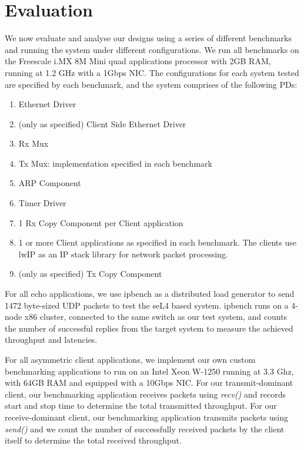\chapter{Evaluation}\label{ch:evaluation}

We now evaluate and analyse our designs using a series of different benchmarks and running
the system under different configurations. We run all benchmarks on the
Freescale i.MX 8M Mini quad applications processor with 2GB RAM, running at 1.2 GHz
with a 1Gbps NIC. The configurations for each system tested are specified by each benchmark,
and the system comprises of the following PDs:
\begin{enumerate}
    \item Ethernet Driver
    \item (only as specified) Client Side Ethernet Driver
    \item Rx Mux
    \item Tx Mux: implementation specified in each benchmark
    \item ARP Component
    \item Timer Driver
    \item 1 Rx Copy Component per Client application
    \item 1 or more Client applications as specified in each benchmark. 
        The clients use lwIP \cite{Dunkels_01} as an IP stack library for network packet processing. 
    \item (only as specified) Tx Copy Component
\end{enumerate}

For all echo applications, we use ipbench as a distributed load generator 
to send 1472 byte-sized UDP packets to test the seL4 based system. ipbench runs on a 4-node x86 cluster, 
connected to the same switch as our test system,
and counts the number of successful replies from the target system to measure the achieved throughput and latencies.

For all asymmetric client applications, we implement our own custom benchmarking applications to run on an Intel Xeon W-1250
running at 3.3 Ghz, with 64GB RAM and equipped with a 10Gbps NIC. For our transmit-dominant client, our benchmarking
application receives packets using \emph{recv()} and records start and stop time to determine the total transmitted
throughput. For our receive-dominant client, our benchmarking application transmits packets using \emph{send()} and
we count the number of successfully received packets by the client itself to determine the total received throughput.

